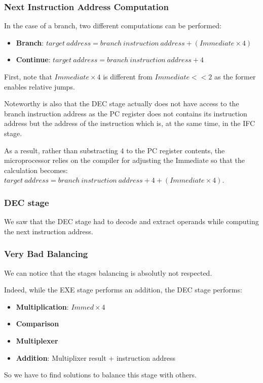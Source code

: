 \begin{frame}
  \frametitle{Next Instruction Address Computation}

  In the case of a branch, two different computations can be performed:

  \begin{itemize}
    \item
      \textbf{Branch}:
      $target~address = branch~instruction~address + (Immediate \times 4)$
    \item
      \textbf{Continue}:
      $target~address = branch~instruction~address + 4$
  \end{itemize}

  \-

  First, note that $Immediate \times 4$ is different from $Immediate << 2$ as
  the former enables relative jumps.

  \-

  Noteworthy is also that the DEC stage actually does not have access to
  the branch instruction address as the PC register does not contains its
  instruction address but the address of the instruction which is, at the
  same time, in the IFC stage.

  \-

  As a result, rather than substracting $4$ to the PC register contents, the
  microprocessor relies on the compiler for adjusting the Immediate so that
  the calculation becomes:
  $target~address = branch~instruction~address + 4 + (Immediate \times 4)$.
\end{frame}


\begin{frame}
  \frametitle{DEC stage}

  We saw that the DEC stage had to decode and extract operands while
  computing the next instruction address.

  \begin{center}
  \end{center}
\end{frame}


\begin{frame}
  \frametitle{Very Bad Balancing}

  We can notice that the stages balancing is absolutly not respected.

  \-

  Indeed, while the EXE stage performs an addition, the DEC stage performs:

  \begin{itemize}
    \item
      \textbf{Multiplication}: $Immed \times 4$
    \item
      \textbf{Comparison}
    \item
      \textbf{Multiplexer}
    \item
      \textbf{Addition}: Multiplixer result + instruction address
  \end{itemize}

  \-

  So we have to find solutions to balance this stage with others.
\end{frame}

